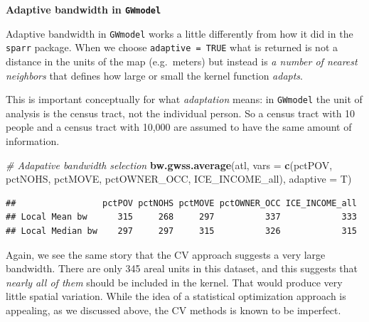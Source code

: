 \documentclass[
]{book}
\newenvironment{Shaded}{\begin{snugshade}}{\end{snugshade}}
\newcommand{\AttributeTok}[1]{\textcolor[rgb]{0.13,0.29,0.53}{#1}}
\newcommand{\CommentTok}[1]{\textcolor[rgb]{0.56,0.35,0.01}{\textit{#1}}}
\newcommand{\FunctionTok}[1]{\textcolor[rgb]{0.13,0.29,0.53}{\textbf{#1}}}
\newcommand{\NormalTok}[1]{#1}
\newcommand{\StringTok}[1]{\textcolor[rgb]{0.31,0.60,0.02}{#1}}
\newenvironment{rmdnote}[1]
  {
  \begin{itemize}
  \renewcommand{\labelitemi}{
    \raisebox{-.7\height}[0pt][0pt]{
      {\setkeys{Gin}{width=3em,keepaspectratio}\texttt{[image: images/\#1]}}
    }
  }
  \setlength{\fboxsep}{1em}
  \begin{note}
  \item
  }
  {
  \end{note}
  \end{itemize}
  }
\begin{document}
\begin{rmdnote}{note}
\textbf{Adaptive bandwidth in \texttt{GWmodel}}

Adaptive bandwidth in \texttt{GWmodel} works a little differently from how it did in the \texttt{sparr} package. When we choose \texttt{adaptive\ =\ TRUE} what is returned is not a distance in the units of the map (e.g.~meters) but instead is \emph{a number of nearest neighbors} that defines how large or small the kernel function \emph{adapts}.

This is important conceptually for what \emph{adaptation} means: in \texttt{GWmodel} the unit of analysis is the census tract, not the individual person. So a census tract with 10 people and a census tract with 10,000 are assumed to have the same amount of information.

\end{rmdnote}

\begin{Shaded}
\begin{Highlighting}[]
\CommentTok{\# Adapative bandwidth selection}
\FunctionTok{bw.gwss.average}\NormalTok{(atl, }\AttributeTok{vars =} \FunctionTok{c}\NormalTok{(}\StringTok{\textquotesingle{}pctPOV\textquotesingle{}}\NormalTok{, }\StringTok{\textquotesingle{}pctNOHS\textquotesingle{}}\NormalTok{, }\StringTok{\textquotesingle{}pctMOVE\textquotesingle{}}\NormalTok{, }
                              \StringTok{\textquotesingle{}pctOWNER\_OCC\textquotesingle{}}\NormalTok{, }\StringTok{\textquotesingle{}ICE\_INCOME\_all\textquotesingle{}}\NormalTok{),}
                \AttributeTok{adaptive =}\NormalTok{ T)}
\end{Highlighting}
\end{Shaded}

\begin{verbatim}
##                 pctPOV pctNOHS pctMOVE pctOWNER_OCC ICE_INCOME_all
## Local Mean bw      315     268     297          337            333
## Local Median bw    297     297     315          326            315
\end{verbatim}

Again, we see the same story that the CV approach suggests a very large bandwidth. There are only 345 areal units in this dataset, and this suggests that \emph{nearly all of them} should be included in the kernel. That would produce very little spatial variation. While the idea of a statistical optimization approach is appealing, as we discussed above, the CV methods is known to be imperfect.
\end{document}
